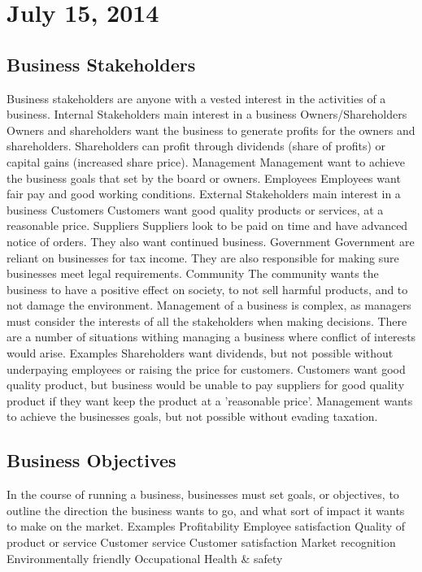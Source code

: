 \section{July 15, 2014}

\subsection{Business Stakeholders}
\begin{outline}
\1 Business stakeholders are anyone with a vested interest in the activities of a business.
\2 Internal Stakeholders main interest in a business
\3 Owners/Shareholders
\4 Owners and shareholders want the business to generate profits for the owners and shareholders. Shareholders can profit through dividends (share of profits) or capital gains (increased share price).
\3 Management
\4 Management want to achieve the business goals that set by the board or owners.
\3 Employees
\4 Employees want fair pay and good working conditions.
\2 External Stakeholders main interest in a business
\3 Customers
\4 Customers want good quality products or services, at a reasonable price.
\3 Suppliers
\4 Suppliers look to be paid on time and have advanced notice of orders. They also want continued business.
\3 Government
\4 Government are reliant on businesses for tax income. They are also responsible for making sure businesses meet legal requirements.
\3 Community
\4 The community wants the business to have a positive effect on society, to not sell harmful products, and to not damage the environment.
\1 Management of a business is complex, as managers must consider the interests of all the stakeholders when making decisions. 
\2 There are a number of situations withing managing a business where conflict of interests would arise.
\3 Examples
\4 Shareholders want dividends, but not possible without underpaying employees or raising the price for customers.
\4 Customers want good quality product, but business would be unable to pay suppliers for good quality product if they want keep the product at a 'reasonable price'.
\4 Management wants to achieve the businesses goals, but not possible without evading taxation.
\end{outline}

\subsection{Business Objectives}
\begin{outline}
\1 In the course of running a business, businesses must set goals, or objectives, to outline the direction the business wants to go, and what sort of impact it wants to make on the market.
\2 Examples
\3 Profitability
\3 Employee satisfaction
\3 Quality of product or service
\3 Customer service
\3 Customer satisfaction
\3 Market recognition
\3 Environmentally friendly
\3 Occupational Health \& safety
\end{outline}